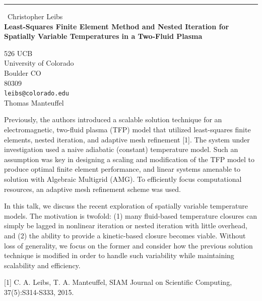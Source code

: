 \documentclass{report}
\begin{document}
\begin{center}
\rule{6in}{1pt} \
{\large Christopher Leibs \\
{\bf Least-Squares Finite Element Method and Nested Iteration for Spatially Variable Temperatures in a Two-Fluid Plasma}}

526 UCB \\ University of Colorado \\ Boulder CO \\ 80309
\\
{\tt leibs@colorado.edu}\\
Thomas Manteuffel\end{center}

Previously, the authors introduced a scalable solution technique for an
electromagnetic, two-fluid plasma (TFP) model that utilized least-squares
finite elements, nested iteration, and adaptive mesh refinement [1]. The
system under investigation used a naive adiabatic (constant) temperature
model. Such an assumption was key in designing a scaling and modification
of the TFP model to produce optimal finite element performance, and
linear systems amenable to solution with Algebraic Multigrid (AMG). To
efficiently focus computational resources, an adaptive mesh refinement
scheme was used.

In this talk, we discuss the recent exploration of spatially variable
temperature models. The motivation is twofold: (1) many fluid-based
temperature closures can simply be lagged in nonlinear iteration or
nested iteration with little overhead, and (2) the ability to provide a
kinetic-based closure becomes viable. Without loss of generality, we
focus on the former and consider how the previous solution technique is
modified in order to handle such variability while maintaining
scalability and efficiency.

[1] C. A. Leibs, T. A. Manteuffel, SIAM Journal on Scientific Computing,
37(5):S314-S333, 2015.
\end{document}
